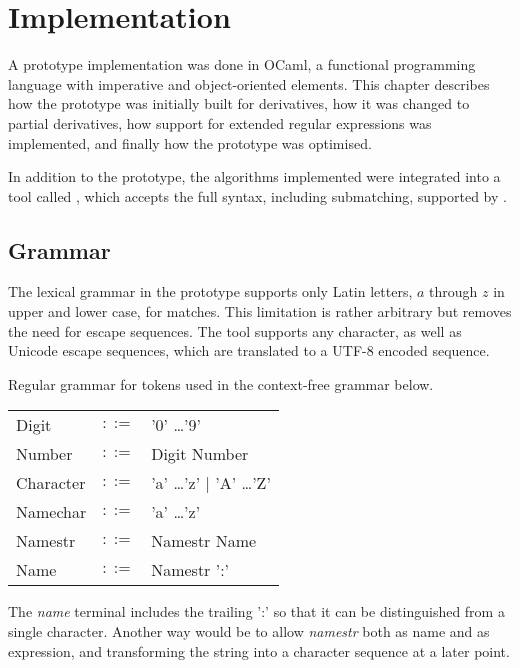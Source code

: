 \chapter{Implementation}
\label{implementation}

A prototype implementation was done in OCaml, a functional programming language
with imperative and object-oriented elements. This chapter describes how the
prototype was initially built for derivatives, how it was changed to partial
derivatives, how support for extended regular expressions was implemented, and
finally how the prototype was optimised.

In addition to the prototype, the algorithms implemented were integrated into a
tool called \dreml, which accepts the full syntax, including
submatching, supported by \ocamllex.



\section{Grammar}

The lexical grammar in the prototype supports only Latin letters, $a$ through
$z$ in upper and lower case, for matches. This limitation is rather arbitrary
but removes the need for escape sequences. The \dreml{} tool supports any
character, as well as Unicode escape sequences, which are translated to a UTF-8
encoded sequence.

\begin{defn}
   \label{defn-gram-reg}
   Regular grammar for tokens used in the context-free grammar below.

   \begin{tabular}{lrl}
      Digit	& $::=$	& '0' \dots '9'				\\
      Number	& $::=$	& Digit Number				\\
      Character	& $::=$	& 'a' \dots 'z' $|$ 'A' \dots 'Z'	\\
      Namechar	& $::=$	& 'a' \dots 'z'				\\
      Namestr	& $::=$	& Namestr Name				\\
      Name	& $::=$	& Namestr ':'				\\
   \end{tabular}
\end{defn}

The \textit{name} terminal includes the trailing ':' so that it can be
distinguished from a single character. Another way would be to allow
\textit{namestr} both as name and as expression, and transforming the string
into a character sequence at a later point.

